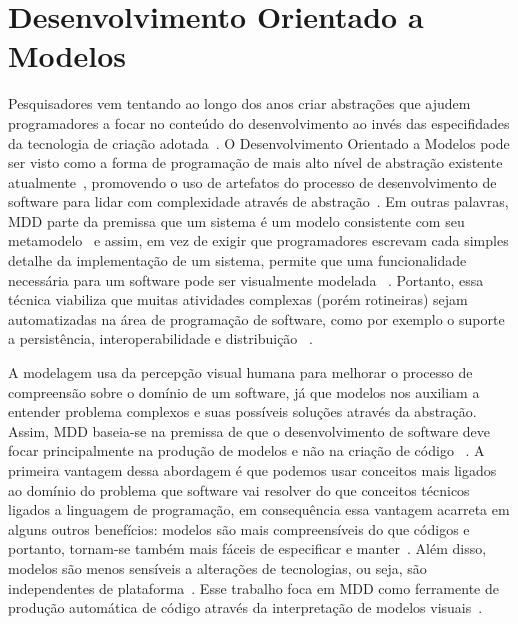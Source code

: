 \section{Desenvolvimento Orientado a Modelos}
\label{referencial-mdd}
Pesquisadores vem tentando ao longo dos anos criar abstrações que ajudem programadores a focar no conteúdo do desenvolvimento ao invés das especifidades da tecnologia de criação adotada~\cite{viyovic2014sirius}. O Desenvolvimento Orientado a Modelos  pode ser visto como a forma de programação de mais alto nível de abstração existente atualmente~\cite{atkinson2003model}, promovendo o uso de artefatos do processo de desenvolvimento de software para lidar com complexidade através de abstração~\cite{viyovic2014sirius}. Em outras palavras, MDD parte da premissa que um sistema é um modelo consistente com seu metamodelo~\cite{vujovic2014comparative} e assim, em vez de exigir que programadores escrevam cada simples detalhe da implementação de um sistema, permite que uma funcionalidade necessária para um software pode ser visualmente modelada ~\cite{atkinson2003model}. Portanto, essa técnica viabiliza que muitas atividades complexas (porém rotineiras) sejam automatizadas na área de programação de software, como por exemplo o suporte a persistência, interoperabilidade e distribuição ~\cite{atkinson2003model}.

A modelagem usa da percepção visual humana para melhorar o processo de compreensão sobre o domínio de um software, já que modelos nos auxiliam a entender problema complexos e suas possíveis soluções através da abstração. Assim, MDD baseia-se na premissa de que o desenvolvimento de software deve focar principalmente na produção de modelos e não na criação de código ~\cite{selic2003pragmatics}. A primeira vantagem dessa abordagem é que podemos usar conceitos mais ligados ao domínio do problema que software vai resolver do que conceitos técnicos ligados a linguagem de programação, em consequência essa vantagem acarreta em alguns outros benefícios: modelos são mais compreensíveis do que códigos e portanto, tornam-se também mais fáceis de especificar e manter~\cite{selic2003pragmatics}. Além disso, modelos são menos sensíveis a alterações de tecnologias, ou seja, são independentes de plataforma~\cite{selic2003pragmatics}. Esse trabalho foca em MDD como ferramente de produção automática de código através da interpretação de modelos visuais~\cite{selic2003pragmatics, viyovic2014sirius}.

